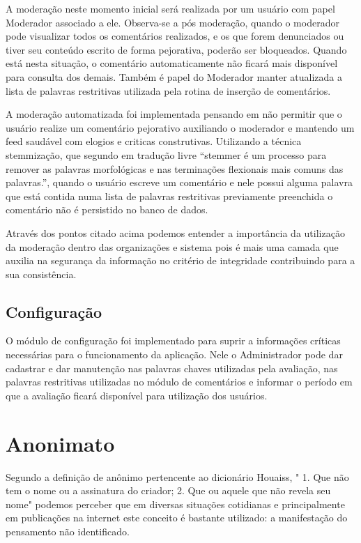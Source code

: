 \documentclass[12pt, a4paper]{report}
\begin{document}
A moderação neste momento inicial será realizada por um usuário com papel Moderador associado a ele. Observa-se a pós moderação, quando o moderador pode visualizar todos os comentários realizados, e os que forem denunciados ou tiver seu conteúdo escrito de forma pejorativa, poderão ser bloqueados. Quando está nesta situação, o comentário automaticamente não ficará mais disponível para consulta dos demais. Também é papel do Moderador manter atualizada a lista de palavras restritivas utilizada pela rotina de inserção de comentários. 


A moderação automatizada foi implementada pensando em não permitir que o usuário realize um comentário pejorativo auxiliando o moderador e mantendo um feed saudável com elogios e criticas construtivas. Utilizando a técnica stemmização, que segundo \cite{porter1980} em tradução livre “stemmer é um processo para remover as palavras morfológicas e nas terminações flexionais mais comuns das palavras.”, quando o usuário escreve um comentário e nele possui alguma palavra que está contida numa lista de palavras restritivas previamente preenchida o comentário não é persistido no banco de dados.  

Através dos pontos citado acima podemos entender a importância da utilização da moderação dentro das organizações e sistema pois é  mais uma camada que auxilia na segurança da informação no critério de integridade contribuindo para a sua consistência.

\subsection{Configuração}
O módulo de configuração foi implementado para suprir a  informações críticas necessárias para o funcionamento da aplicação. Nele o Administrador pode dar cadastrar e dar manutenção nas palavras chaves utilizadas pela avaliação, nas palavras restritivas utilizadas no módulo de comentários e informar o período em que a avaliação ficará disponível para utilização dos usuários.

\section{ Anonimato}
%
Segundo a definição de anônimo pertencente ao dicionário Houaiss, " 1. Que não tem o nome ou a assinatura do criador; 2. Que ou aquele que não revela seu nome" \cite[p. 7]{houasis2001} podemos perceber que em diversas situações cotidianas e principalmente em publicações na internet este conceito é bastante utilizado: a manifestação do pensamento não identificado.
\end{document}
